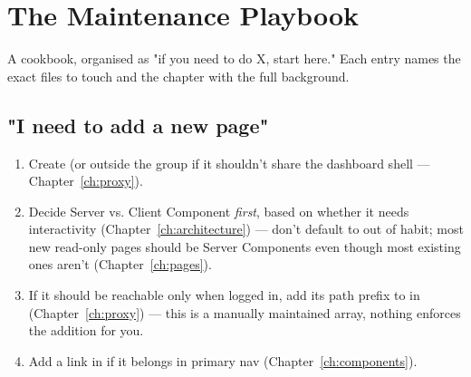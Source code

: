 \chapter{The Maintenance Playbook}
\label{ch:playbook}

A cookbook, organised as "if you need to do X, start here." Each entry names the exact files to touch and the chapter with the full background.

\section{"I need to add a new page"}
\begin{enumerate}
  \item Create  (or outside the group if it shouldn't share the dashboard shell — Chapter~\ref{ch:proxy}).
  \item Decide Server vs. Client Component \emph{first}, based on whether it needs interactivity (Chapter~\ref{ch:architecture}) — don't default to  out of habit; most new read-only pages should be Server Components even though most existing ones aren't (Chapter~\ref{ch:pages}).
  \item If it should be reachable only when logged in, add its path prefix to  in  (Chapter~\ref{ch:proxy}) — this is a manually maintained array, nothing enforces the addition for you.
  \item Add a link in  if it belongs in primary nav (Chapter~\ref{ch:components}).
\end{enumerate}


